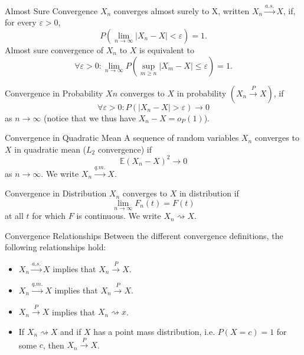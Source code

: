 \documentclass[avery5371,grid]{flashcards}
\begin{document}
\begin{flashcard}[Definition]{Almost Sure Convergence}
$X_n$ converges almost surely to X, written $X_n \overset{a.s.}{\longrightarrow} X$, if, for every $\varepsilon > 0$, 
\[
P\left( \lim_{n \to \infty} \left| X_n - X \right| < \varepsilon \right) = 1.
\]
Almost sure convergence of $X_n$ to $X$ is equivalent to 
\[
\forall \varepsilon > 0: \lim_{n \to \infty} P\left( \sup_{m \ge n} \left| X_m - X \right| \le \varepsilon \right) = 1.
\]
\end{flashcard}

\begin{flashcard}[Definition]{Convergence in Probability}
$Xn$ converges to $X$ in probability $(X_n \overset{P}{\longrightarrow} X)$, if
\[
\forall \varepsilon > 0: P\left( \left| X_n - X \right| > \varepsilon \right) \to 0
\]
as $n \to \infty$ (notice that we thus have $X_n - X = o_P(1)$).
\end{flashcard}

\begin{flashcard}[Definition]{Convergence in Quadratic Mean}
A sequence of random variables $X_n$ converges to $X$ in quadratic mean ($L_2$ convergence) if 
\[
\mathbb{E}(X_n - X)^2 \to 0
\]
as $n \to \infty$. We write $X_n \overset{q.m.}{\longrightarrow} X$.
\end{flashcard}

\begin{flashcard}[Definition]{Convergence in Distribution}
 $X_n$ converges to $X$ in distribution if 
 \[
 \lim_{n \to \infty} F_n(t) = F(t)
 \]
 at all $t$ for which $F$ is continuous. We write $X_n \rightsquigarrow X$.
\end{flashcard}

\begin{flashcard}[Theorem]{Convergence Relationships}
Between the different convergence definitions, the following relationships hold:
\begin{itemize}
 \item $X_n \overset{a.s.}\longrightarrow X$ implies that $X_n \overset{P} \to X$.
 \item $X_n \overset{q.m.}\longrightarrow X$ implies that $X_n \overset{P}\to X$.
 \item $X_n \overset{P}\to X$ implies that $X_n \rightsquigarrow x$.
 \item If $X_n \rightsquigarrow X$ and if $X$ has a point mass distribution, i.e. $P(X=c)=1$ for some $c$, then $X_n \overset{P}\to X$.
\end{itemize}
\end{flashcard}
\end{document}
